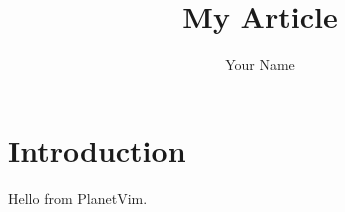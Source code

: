 \documentclass{article}
\title{My Article}
\author{Your Name}
\begin{document}
\maketitle
\section{Introduction}
Hello from PlanetVim.
\end{document}
